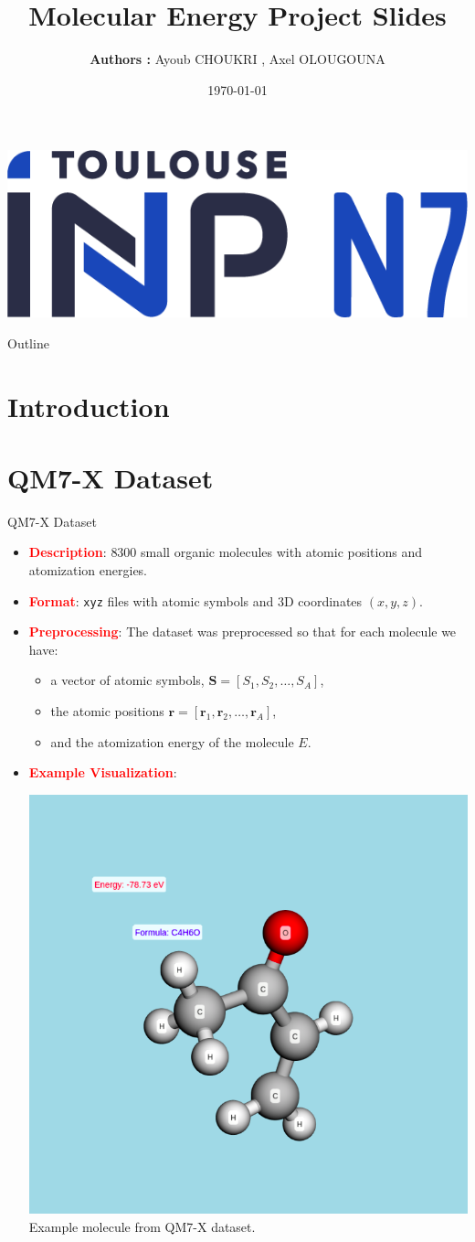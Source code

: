 \documentclass[10pt]{beamer}
\title[Molecular Energy Project Slides] {\textbf{ Molecular Energy Project Slides}}
\author[]{\textbf{\large Authors :} Ayoub CHOUKRI , Axel OLOUGOUNA}
\date{\today}
\begin{document}
\begin{frame}
  \titlepage
  \begin{center}
    \includegraphics[width=0.3\linewidth]{Images_Ayoub/Logo/Logo.png}
  \end{center}
\end{frame}

\begin{frame}{Outline}
  \tableofcontents
\end{frame}

\section*{Introduction}


\section{QM7-X Dataset}
\begin{frame}{QM7-X Dataset}
  \begin{itemize}
    \item \textcolor{red}{\textbf{Description}}: $8300$ small organic molecules with atomic positions and atomization energies.
    \item \textcolor{red}{\textbf{Format}}: \texttt{xyz} files with atomic symbols and 3D coordinates \( (x, y, z) \).
    \item \textcolor{red}{\textbf{Preprocessing}}: The dataset was preprocessed so that for each molecule we have:
      \begin{itemize}
        \item a vector of atomic symbols, $\mathbf{S} = [S_1, S_2, \ldots, S_A]$,
        \item the atomic positions $\mathbf{r} = [\mathbf{r}_1, \mathbf{r}_2, \ldots, \mathbf{r}_A]$,
        \item and the atomization energy of the molecule $E$.
      \end{itemize}
    \item \textcolor{red}{\textbf{Example Visualization}}:
      \begin{center}
        \includegraphics[width=0.4\linewidth]{Images_Ayoub/Dataset/Molecule/image.png}
        \\
        {\scriptsize Example molecule from QM7-X dataset.}
      \end{center}
  \end{itemize}
\end{frame}
\end{document}
